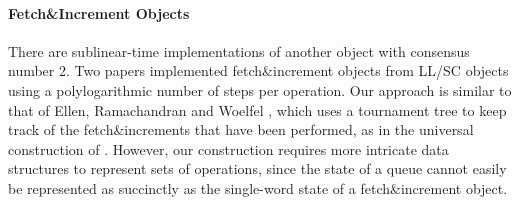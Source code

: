\paragraph{Fetch\&Increment Objects}
There are sublinear-time implementations of another object
with consensus number 2.
Two papers \cite{ERW12,10.1007/978-3-642-41527-2_20}
implemented fetch\&increment objects from LL/SC objects
using a polylogarithmic number of steps per operation.
Our approach is similar to that of Ellen, Ramachandran and Woelfel \cite{ERW12},
which uses a tournament tree to keep track of the fetch\&increments
that have been performed, as in the universal construction of \cite{DBLP:conf/stoc/AfekDT95}.
However, our construction requires more intricate
data structures to represent sets of operations, since the state of a queue cannot easily be represented as succinctly
as the single-word state of a fetch\&increment object.


